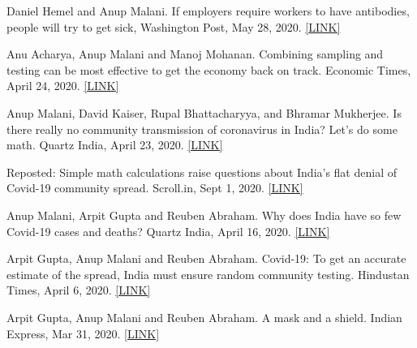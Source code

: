 \documentclass[11pt,letterpaper]{report}
\begin{document}
\begin{tablist}
        \item[2020] \tab{}Daniel Hemel and Anup Malani.  If employers require workers to have antibodies, people will try to get sick, Washington Post, May 28, 2020.  \href{https://www.washingtonpost.com/outlook/2020/05/28/immunity-passports-antibodies-coronavirus/}{[LINK]}
        
        \item[2020] \tab{}Anu Acharya, Anup Malani and Manoj Mohanan.  Combining sampling and testing can be most effective to get the economy back on track.  Economic Times, April 24, 2020.  \href{https://economictimes.indiatimes.com/news/economy/policy/view-combining-sampling-and-testing-can-be-most-effective-to-get-the-economy-back-on-track/articleshow/75332462.cms}{[LINK]}
        
        \item[2020] \tab{}Anup Malani, David Kaiser, Rupal Bhattacharyya, and Bhramar Mukherjee.  Is there really no community transmission of coronavirus in India? Let’s do some math.  Quartz India, April 23, 2020.  \href{https://qz.com/india/1842275/is-there-really-no-community-transmission-of-coronavirus-in-india/}{[LINK]} 
        
        Reposted: Simple math calculations raise questions about India’s flat denial of Covid-19 community spread.  Scroll.in, Sept 1, 2020.  \href{https://scroll.in/article/960155/simple-math-calculations-raise-questions-about-indias-flat-denial-of-covid-19-community-spread}{[LINK]}
        
        \item[2020] \tab{}Anup Malani, Arpit Gupta and Reuben Abraham.  Why does India have so few Covid-19 cases and deaths?  Quartz India, April 16, 2020.  \href{https://qz.com/india/1839018/why-does-india-have-so-few-coronavirus-covid-19-cases-and-deaths/}{[LINK]}
        
        \item[2020] \tab{}Arpit Gupta, Anup Malani and Reuben Abraham.  Covid-19: To get an accurate estimate of the spread, India must ensure random community testing.  Hindustan Times, April 6, 2020.  \href{https://www.hindustantimes.com/analysis/covid-19-to-get-an-accurate-estimate-of-the-spread-india-must-ensure-random-community-testing/story-qJ8yKgDujtOnQygiBJuXYI.html}{[LINK]}
        
        \item[2020] \tab{}Arpit Gupta, Anup Malani and Reuben Abraham.  A mask and a shield.  Indian Express, Mar 31, 2020.  \href{https://indianexpress.com/article/opinion/columns/coronavirus-mask-shortage-n-95-masks-for-coronavirus-6339197/}{[LINK]}
        

\end{tablist}
\end{document}
